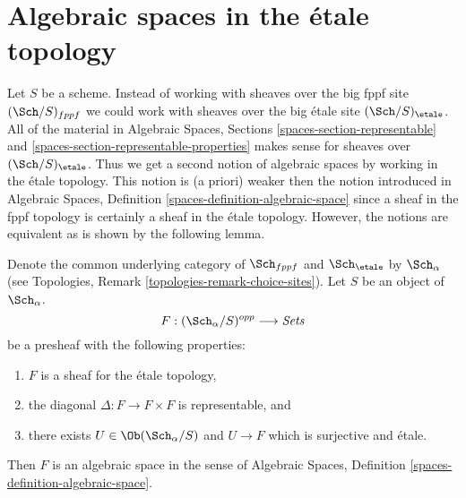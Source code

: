 \section{Algebraic spaces in the \'etale topology}
\label{section-spaces-etale}

\noindent
Let $S$ be a scheme. Instead of working with sheaves over
the big fppf site $(\Sch/S)_{fppf}$ we could work with sheaves
over the big \'etale site $(\Sch/S)_\etale$. All of the material in
Algebraic Spaces, Sections \ref{spaces-section-representable} and
\ref{spaces-section-representable-properties}
makes sense for sheaves over $(\Sch/S)_\etale$.
Thus we get a second notion of algebraic spaces by working in the
\'etale topology. This notion is (a priori) weaker then the notion introduced
in Algebraic Spaces, Definition \ref{spaces-definition-algebraic-space}
since a sheaf in the fppf topology is certainly a sheaf in the \'etale
topology. However, the notions are equivalent as is shown by the following
lemma.

\begin{lemma}
\label{lemma-spaces-etale}
Denote the common underlying category of $\Sch_{fppf}$
and $\Sch_\etale$ by $\Sch_\alpha$ (see
Topologies, Remark \ref{topologies-remark-choice-sites}). Let $S$ be an object
of $\Sch_\alpha$. 
$$
F : (\Sch_\alpha/S)^{opp} \longrightarrow \textit{Sets}
$$
be a presheaf with the following properties:
\begin{enumerate}
\item $F$ is a sheaf for the \'etale topology,
\item the diagonal $\Delta : F \to F \times F$ is representable, and
\item there exists $U \in \Ob(\Sch_\alpha/S)$
and $U \to F$ which is surjective and \'etale.
\end{enumerate}
Then $F$ is an algebraic space in the sense of
Algebraic Spaces, Definition \ref{spaces-definition-algebraic-space}.
\end{lemma}

